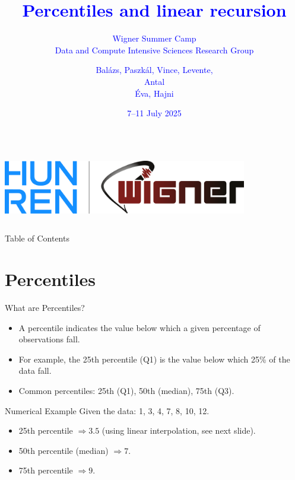 \documentclass{beamer}
\title{\textcolor{blue}{Percentiles and linear recursion}}
\subtitle{\textcolor{blue}{Wigner Summer Camp \\ Data and Compute Intensive Sciences Research Group}}
\author{\textcolor{blue}{Bal\'azs, Paszk\'al, Vince, Levente, \\ Antal \\ \'Eva, Hajni}}
\date{\textcolor{blue}{7--11 July 2025}}
\begin{document}
\begin{frame}
  \titlepage

  \begin{columns}
    \centering
    \includegraphics[width=0.8\textwidth]{../img/logo.png}
  \end{columns}
\end{frame}

\begin{frame}{Table of Contents}
  \tableofcontents
\end{frame}

\section{Percentiles}
\begin{frame}{What are Percentiles?}
\begin{itemize}
  \item A percentile indicates the value below which a given percentage of observations fall.
  \item For example, the 25th percentile (Q1) is the value below which 25\% of the data fall.
  \item Common percentiles: 25th (Q1), 50th (median), 75th (Q3).
\end{itemize}
\end{frame}

\begin{frame}{Numerical Example}
Given the data: 1, 3, 4, 7, 8, 10, 12.
\begin{itemize}
  \item 25th percentile \( \Rightarrow 3.5 \) (using linear interpolation, see next slide).
  \item 50th percentile (median) \( \Rightarrow 7 \).
  \item 75th percentile \( \Rightarrow 9 \).
\end{itemize}
\end{frame}
\end{document}
